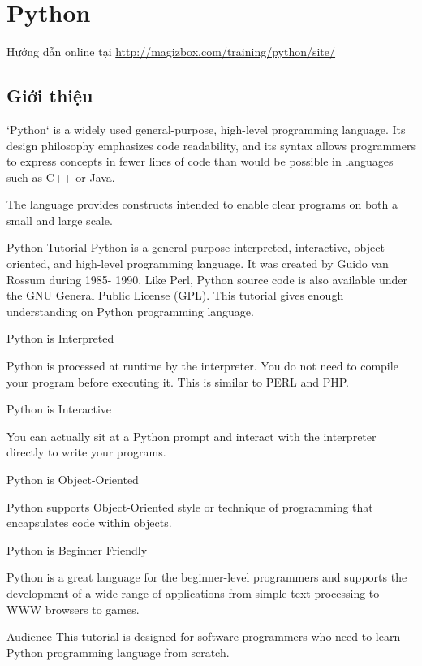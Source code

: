 \chapter{Python}

Hướng dẫn online tại \href{http://magizbox.com/training/python/site/}{http://magizbox.com/training/python/site/}

\section{Giới thiệu}

\begin{item}
  \item `Python` is a widely used general-purpose, high-level programming language. Its design philosophy emphasizes code readability, and its syntax allows programmers to express concepts in fewer lines of code than would be possible in languages such as C++ or Java.
  \item The language provides constructs intended to enable clear programs on both a small and large scale.
\end{item}

Python Tutorial
Python is a general-purpose interpreted, interactive, object-oriented, and high-level programming language. It was created by Guido van Rossum during 1985- 1990. Like Perl, Python source code is also available under the GNU General Public License (GPL). This tutorial gives enough understanding on Python programming language.

Python is Interpreted

Python is processed at runtime by the interpreter. You do not need to compile your program before executing it. This is similar to PERL and PHP.

Python is Interactive

You can actually sit at a Python prompt and interact with the interpreter directly to write your programs.

Python is Object-Oriented

Python supports Object-Oriented style or technique of programming that encapsulates code within objects.

Python is Beginner Friendly

Python is a great language for the beginner-level programmers and supports the development of a wide range of applications from simple text processing to WWW browsers to games.

Audience
This tutorial is designed for software programmers who need to learn Python programming language from scratch.


